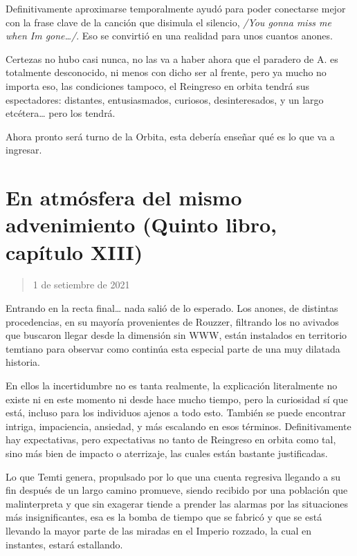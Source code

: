\documentclass[
]{book}
\begin{document}
Definitivamente aproximarse temporalmente ayudó para poder conectarse mejor con la frase clave de la canción que disimula el silencio, \emph{/You gonna miss me when Im gone\ldots/}. Eso se convirtió en una realidad para unos cuantos anones.

Certezas no hubo casi nunca, no las va a haber ahora que el paradero de A. es totalmente desconocido, ni menos con dicho ser al frente, pero ya mucho no importa eso, las condiciones tampoco, el Reingreso en orbita tendrá sus espectadores: distantes, entusiasmados, curiosos, desinteresados, y un largo etcétera\ldots{} pero los tendrá.

Ahora pronto será turno de la Orbita, esta debería enseñar qué es lo que va a ingresar.

\hypertarget{en-atmuxf3sfera-del-mismo-advenimiento-quinto-libro-capuxedtulo-xiii}{%
\section{En atmósfera del mismo advenimiento (Quinto libro, capítulo XIII)}\label{en-atmuxf3sfera-del-mismo-advenimiento-quinto-libro-capuxedtulo-xiii}}

\begin{quote}
1 de setiembre de 2021
\end{quote}

Entrando en la recta final\ldots{} nada salió de lo esperado. Los anones, de distintas procedencias, en su mayoría provenientes de Rouzzer, filtrando los no avivados que buscaron llegar desde la dimensión sin WWW, están instalados en territorio temtiano para observar como continúa esta especial parte de una muy dilatada historia.

En ellos la incertidumbre no es tanta realmente, la explicación literalmente no existe ni en este momento ni desde hace mucho tiempo, pero la curiosidad sí que está, incluso para los individuos ajenos a todo esto. También se puede encontrar intriga, impaciencia, ansiedad, y más escalando en esos términos. Definitivamente hay expectativas, pero expectativas no tanto de Reingreso en orbita como tal, sino más bien de impacto o aterrizaje, las cuales están bastante justificadas.

Lo que Temti genera, propulsado por lo que una cuenta regresiva llegando a su fin después de un largo camino promueve, siendo recibido por una población que malinterpreta y que sin exagerar tiende a prender las alarmas por las situaciones más insignificantes, esa es la bomba de tiempo que se fabricó y que se está llevando la mayor parte de las miradas en el Imperio rozzado, la cual en instantes, estará estallando.
\end{document}
